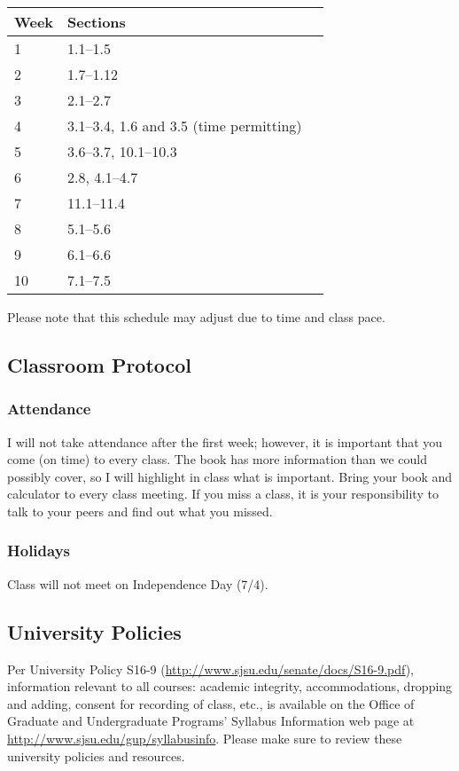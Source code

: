 \documentclass[letterpaper,12pt,fleqn]{article}
\begin{document}
\begin{tabular}{|l|l|c|}
  \hline
  \textbf{Week} & \textbf{Sections} \\
  \hline
  1 & 1.1--1.5 \\
  \hline
  2 & 1.7--1.12 \\
  \hline
  3 & 2.1--2.7 \\
  \hline
  4 & 3.1--3.4, 1.6 and 3.5 (time permitting) \\
  \hline
  5 & 3.6--3.7, 10.1--10.3 \\
  \hline
  6 & 2.8, 4.1--4.7 \\
  \hline
  7 & 11.1--11.4 \\
  \hline
  8 & 5.1--5.6 \\
  \hline
  9 & 6.1--6.6 \\
  \hline
  10 & 7.1--7.5  \\
  \hline
\end{tabular}

Please note that this schedule may adjust due to time and class pace.

\subsection*{Classroom Protocol}
  
\subsubsection*{Attendance}

I will not take attendance after the first week; however, it is important that you come (on time) to every class. The book
has more information than we could possibly cover, so I will highlight in class what is important. Bring your book and
calculator to every class meeting. If you miss a class, it is your responsibility to talk to your peers and find out what you
missed.

\subsubsection*{Holidays}

Class will not meet on Independence Day (7/4).

\subsection*{University Policies}

Per University Policy S16-9 (\url{http://www.sjsu.edu/senate/docs/S16-9.pdf}), information relevant to all courses:
academic integrity, accommodations, dropping and adding, consent for recording of class, etc., is available on the Office of
Graduate and Undergraduate Programs’ Syllabus Information web page at \url{http://www.sjsu.edu/gup/syllabusinfo}.
Please make sure to review these university policies and resources.
\end{document}

